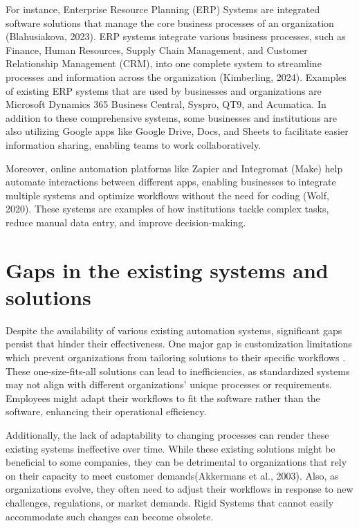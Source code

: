 For instance, Enterprise Resource Planning (ERP) Systems are integrated software solutions that manage the core business processes of an organization (Blahusiakova, 2023). ERP systems integrate various business processes, such as Finance, Human Resources, Supply Chain Management, and Customer Relationship Management (CRM), into one complete system to streamline processes and information across the organization (Kimberling, 2024). Examples of existing ERP systems that are used by businesses and organizations are Microsoft Dynamics 365 Business Central, Syspro, QT9, and Acumatica. In addition to these comprehensive systems, some businesses and institutions are also utilizing Google apps like Google Drive, Docs, and Sheets to facilitate easier information sharing, enabling teams to work collaboratively. 
 
Moreover, online automation platforms like Zapier and Integromat (Make) help automate interactions between different apps, enabling businesses to integrate multiple systems and optimize workflows without the need for coding (Wolf, 2020). These systems are examples of how institutions tackle complex tasks, reduce manual data entry, and improve decision-making.

\section{Gaps in the  existing systems and solutions}

Despite the availability of various existing automation systems, significant gaps persist that hinder their effectiveness. One major gap is customization limitations which prevent organizations from tailoring solutions to their specific workflows \cite{aleixo2010}. These one-size-fits-all solutions can lead to inefficiencies, as standardized systems may not align with different organizations' unique processes or requirements. Employees might adapt their workflows to fit the software rather than the software, enhancing their operational efficiency. 

Additionally, the lack of adaptability to changing processes can render these existing systems ineffective over time. While these existing solutions might be beneficial to some companies, they can be detrimental to organizations that rely on their capacity to meet customer demands(Akkermans et al., 2003). Also, as organizations evolve, they often need to adjust their workflows in response to new challenges, regulations, or market demands. Rigid Systems that cannot easily accommodate such changes can become obsolete. 

